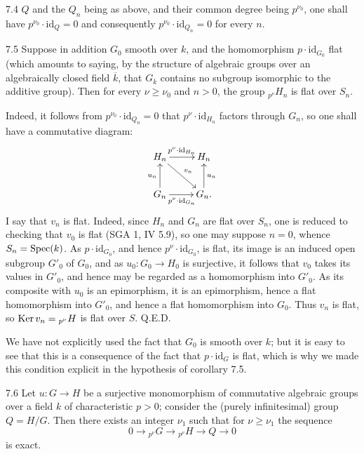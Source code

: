 \begin{corollary}{7.4}\label{VIII.7.4}
$Q$ and the $Q_n$ being as above, and their common degree being $p^{\nu_0}$, one shall have $p^{\nu_0}\cdot\mathrm{id}_Q=0$ and consequently $p^{\nu_0}\cdot\mathrm{id}_{Q_n}=0$ for every $n$.
\end{corollary}
\begin{corollary}{7.5}\label{VIII.7.5}
Suppose in addition $G_0$ smooth over $k$, and the homomorphism $p\cdot\mathrm{id}_{G_0}$ flat (which amounts to saying, by the structure of algebraic groups over an algebraically closed field $\overline k$, that $G_{\overline k}$ contains no subgroup isomorphic to the additive group). Then for every $\nu\geq\nu_0$ and $n>0$, the group ${}_{p^\nu}H_n$ is flat over $S_n$.
\end{corollary}
Indeed, it follows from $p^{\nu_0}\cdot\mathrm{id}_{Q_n}=0$ that $p^\nu\cdot\mathrm{id}_{H_n}$ factors through $G_n$, so one shall have a commutative diagram:
\[
\xymatrix{H_n\ar[r]^{p^\nu\cdot\mathrm{id}_{H_n}}\ar[dr]^{v_n}&H_n\\G_n\ar[u]^{u_n}\ar[r]_{p^\nu\cdot\mathrm{id}_{G_n}}&G_n\ar[u]_{u_n}.}
\]
I say that $v_n$ is flat. Indeed, since $H_n$ and $G_n$ are flat over $S_n$, one is reduced to checking that $v_0$ is flat (SGA 1, IV 5.9), so one may suppose $n=0$, whence $S_n=\operatorname{Spec}(k)$. As $p\cdot\mathrm{id}_{G_0}$, and hence $p^\nu\cdot\mathrm{id}_{G_0}$, is flat, its image is an induced open subgroup $G'_0$ of $G_0$, and as $u_0:G_0\to H_0$ is surjective, it follows that $v_0$ takes its values in $G'_0$, and hence may be regarded as a homomorphism into $G'_0$. As its composite with $u_0$ is an epimorphism, it is an epimorphism, hence a flat homomorphism into $G'_0$, and hence a flat homomorphism into $G_0$. Thus $v_n$ is flat, so $\operatorname{Ker} v_n={}_{p^\nu}H$ is flat over $S$. \hfill Q.E.D.
\begin{remark*}
We have not explicitly used the fact that $G_0$ is smooth over $k$; but it is easy to see that this is a consequence of the fact that $p\cdot\mathrm{id}_G$ is flat, which is why we made this condition explicit in the hypothesis of corollary 7.5.
\end{remark*}
\begin{lemma}{7.6}\label{VIII.7.6}
Let $u:G\to H$ be a surjective monomorphism of commutative algebraic groups over a field $k$ of characteristic $p>0$; consider the (purely infinitesimal) group $Q=H/G$. Then there exists an integer $\nu_1$ such that for $\nu\geq\nu_1$ the sequence
\[
0\to{}_{p^\nu}G\to{}_{p^\nu}H\to Q\to0
\]
is exact.
\end{lemma}
